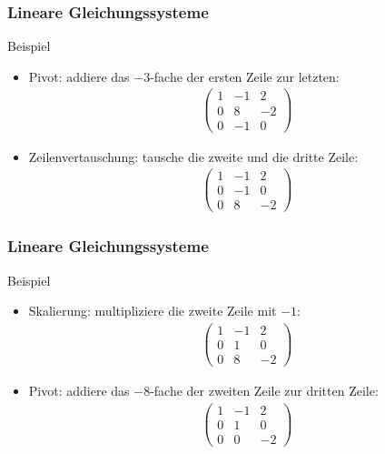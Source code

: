 \documentclass{beamer}
\newcommand{\mytitle}{Lineare Gleichungssysteme}
\begin{document}
\begin{frame}\frametitle{\mytitle}
	\begin{block}{Beispiel}
	\begin{itemize}
	\item \alert{Pivot:} addiere das $-3$-fache der ersten Zeile zur letzten:
		\begin{align*}
		\begin{pmatrix}
			1&-1&2\\0&8&-2\\0&-1&0
		\end{pmatrix}
		\end{align*}
	\item \alert{Zeilenvertauschung:} tausche die zweite und die dritte Zeile:
		\begin{align*}
		\begin{pmatrix}
			1&-1&2\\0&-1&0\\0&8&-2
		\end{pmatrix}
		\end{align*}
	\end{itemize}
	\end{block}
\end{frame}

\begin{frame}\frametitle{\mytitle}
	\begin{block}{Beispiel}
	\begin{itemize}
	\item \alert{Skalierung:} multipliziere die zweite Zeile mit $-1$:
		\begin{align*}
		\begin{pmatrix}
			1&-1&2\\0&1&0\\0&8&-2
		\end{pmatrix}
		\end{align*}
	\item \alert{Pivot:} addiere das $-8$-fache der zweiten Zeile zur dritten Zeile:
		\begin{align*}
		\begin{pmatrix}
			1&-1&2\\0&1&0\\0&0&-2
		\end{pmatrix}
		\end{align*}
	\end{itemize}
	\end{block}
\end{frame}
\end{document}
